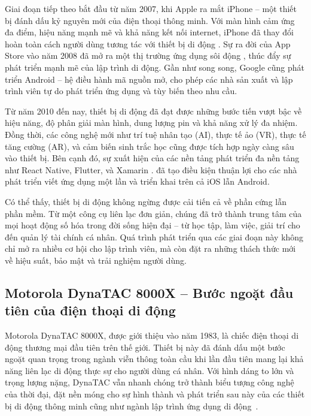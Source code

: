   \begin{flushleft}
    \hspace*{0.8cm}Giai đoạn tiếp theo bắt đầu từ năm 2007, khi Apple ra mắt iPhone – một thiết bị đánh dấu kỷ nguyên mới của điện thoại thông minh. Với màn hình cảm ứng đa điểm, hiệu năng mạnh mẽ và khả năng kết nối internet, iPhone đã thay đổi hoàn toàn cách người dùng tương tác với thiết bị di động \cite{iphone2007}. Sự ra đời của App Store vào năm 2008 đã mở ra một thị trường ứng dụng sôi động \cite{appstore2008}, thúc đẩy sự phát triển mạnh mẽ của lập trình di động. Gần như song song, Google cũng phát triển Android – hệ điều hành mã nguồn mở, cho phép các nhà sản xuất và lập trình viên tự do phát triển ứng dụng và tùy biến theo nhu cầu.
\end{flushleft}

\begin{flushleft}
  \hspace*{0.8cm}Từ năm 2010 đến nay, thiết bị di động đã đạt được những bước tiến vượt bậc về hiệu năng, độ phân giải màn hình, dung lượng pin và khả năng xử lý đa nhiệm. Đồng thời, các công nghệ mới như trí tuệ nhân tạo (AI), thực tế ảo (VR), thực tế tăng cường (AR), và cảm biến sinh trắc học cũng được tích hợp ngày càng sâu vào thiết bị. Bên cạnh đó, sự xuất hiện của các nền tảng phát triển đa nền tảng như React Native, Flutter, và Xamarin \cite{crossplatform}. đã tạo điều kiện thuận lợi cho các nhà phát triển viết ứng dụng một lần và triển khai trên cả iOS lẫn Android.
\end{flushleft}

\begin{flushleft}
  \hspace*{0.8cm}Có thể thấy, thiết bị di động không ngừng được cải tiến cả về phần cứng lẫn phần mềm. Từ một công cụ liên lạc đơn giản, chúng đã trở thành trung tâm của mọi hoạt động số hóa trong đời sống hiện đại – từ học tập, làm việc, giải trí cho đến quản lý tài chính cá nhân. Quá trình phát triển qua các giai đoạn này không chỉ mở ra nhiều cơ hội cho lập trình viên, mà còn đặt ra những thách thức mới về hiệu suất, bảo mật và trải nghiệm người dùng.
\end{flushleft}

\subsection{Motorola DynaTAC 8000X – Bước ngoặt đầu tiên của điện thoại di động}
\renewcommand{\labelitemi}{--}    
\begin{flushleft}
    \hspace*{0.8cm}Motorola DynaTAC 8000X, được giới thiệu vào năm 1983, là chiếc điện thoại di động thương mại đầu tiên trên thế giới. Thiết bị này đã đánh dấu một bước ngoặt quan trọng trong ngành viễn thông toàn cầu khi lần đầu tiên mang lại khả năng liên lạc di động thực sự cho người dùng cá nhân. Với hình dáng to lớn và trọng lượng nặng, DynaTAC vẫn nhanh chóng trở thành biểu tượng công nghệ của thời đại, đặt nền móng cho sự hình thành và phát triển sau này của các thiết bị di động thông minh cũng như ngành lập trình ứng dụng di động~\cite{motorola1983}.
\end{flushleft}

